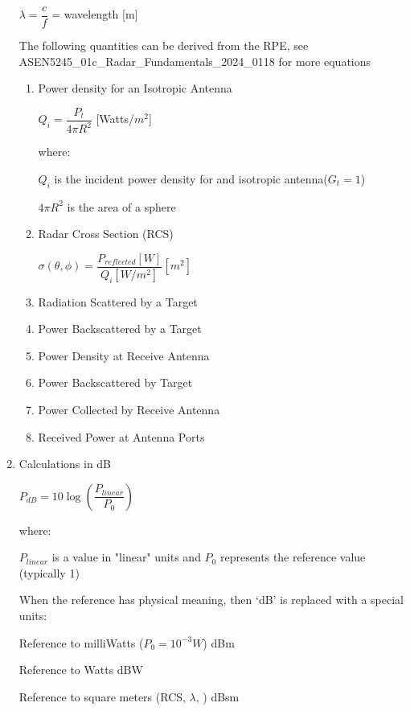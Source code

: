 \documentclass[10pt]{article}
\renewcommand{\frac}{\dfrac}
\begin{document}
\begin{enumerate}
	$\lambda = \frac{c}{f}$ = wavelength [m]

\break
	The following quantities can be derived from the RPE, see ASEN5245\_01c\_Radar\_Fundamentals\_2024\_0118 for more equations

	\begin{enumerate}	
		\item Power density for an Isotropic Antenna

		\centerline{$Q_i = \frac{P_t}{4\pi R^2}$ [Watts/$m^2$]} 

		where:
	
		$Q_i$ is the incident power density for and isotropic antenna($G_t = 1$)
	
		$4 \pi R^2$ is the area of a sphere
	

		\item Radar Cross Section (RCS)

		\centerline{$\sigma (\theta,\phi) = \frac{P_{reflected}[W]}{Q_i [W/m^2]}[m^2]$}
	
		\item Radiation Scattered by a Target

		\item Power Backscattered by a Target

		\item Power Density at Receive Antenna

		\item Power Backscattered by Target

		\item Power Collected by Receive Antenna

		\item Received Power at Antenna Ports

	\end{enumerate}

\item Calculations in dB

	\centerline{$P_{dB} = 10\log (\frac{P_{linear}}{P_0})$}
	
	where:
	
	$P_{linear}$ is a value in "linear" units and $P_0$ represents the reference value (typically 1)
	
	When the reference has physical meaning, then ‘dB’ is replaced with
a special units:

Reference to milliWatts ($P_0 = 10^{-3}  W$) dBm

Reference to Watts dBW

Reference to square meters (RCS, $\lambda$, ) dBsm


\end{enumerate}
\end{document}
